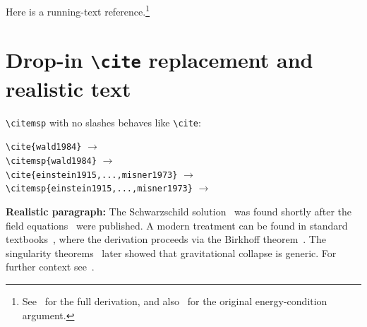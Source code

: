 \documentclass[11pt, a4paper]{article}
\begin{document}
Here is a running-text reference.\footnote{See~ for
the full derivation, and also~ for the original
energy-condition argument.}


\section{Drop-in \texttt{\textbackslash cite} replacement and realistic text}

\texttt{\textbackslash citemsp} with no slashes behaves like
\texttt{\textbackslash cite}:

\medskip\noindent
\verb|\cite{wald1984}| $\longrightarrow$ \cite{wald1984} \\
\verb|\citemsp{wald1984}| $\longrightarrow$  \\[4pt]
\verb|\cite{einstein1915,...,misner1973}| $\longrightarrow$
\cite{einstein1915,schwarzschild1916,wald1984,hawking1974,misner1973} \\
\verb|\citemsp{einstein1915,...,misner1973}| $\longrightarrow$

\bigskip\noindent
\textbf{Realistic paragraph:}
The Schwarzschild solution~ was found shortly
after the field equations~ were published. A modern
treatment can be found in standard
textbooks~, where the derivation
proceeds via the Birkhoff theorem~. The singularity
theorems~ later showed that
gravitational collapse is generic. For further context
see~.


\printbibliography
\end{document}
